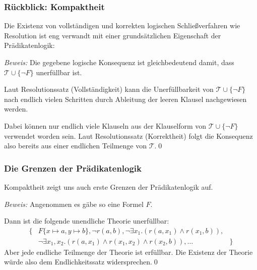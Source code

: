 \documentclass[aspectratio=1610,onlymath]{beamer}
\begin{document}
\maketitle

\begin{frame}\frametitle{Rückblick: Kompaktheit}

Die Existenz von vollständigen und korrekten logischen Schließverfahren wie Resolution
ist eng verwandt mit einer grundsätzlichen Eigenschaft der Prädikatenlogik:\bigskip

\pause

\small
\emph{Beweis:} Die gegebene logische Konsequenz ist gleichbedeutend damit, dass
$\mathcal{T}\cup\{\neg F\}$ unerfüllbar ist.\medskip

Laut Resolutionssatz (Vollständigkeit) kann die Unerfüllbarkeit von $\mathcal{T}\cup\{\neg F\}$ nach endlich vielen Schritten durch Ableitung der leeren Klausel nachgewiesen werden.\medskip

Dabei können nur endlich viele Klauseln aus der Klauselform von $\mathcal{T}\cup\{\neg F\}$ verwendet worden sein. Laut Resolutionssatz (Korrektheit) folgt die Konsequenz also bereits aus einer endlichen Teilmenge von $\mathcal{T}$.\qed

\end{frame}


\begin{frame}\frametitle{Die Grenzen der Prädikatenlogik}

Kompaktheit zeigt uns auch erste Grenzen der Prädikatenlogik auf.
\smallskip

\pause

\pause

\emph{Beweis:} Angenommen es gäbe so eine Formel $F$.\medskip

Dann ist die folgende unendliche Theorie unerfüllbar:
\[\begin{array}{rll}
\big\{ & F\{x\mapsto a,y\mapsto b\},\neg r(a,b), \neg \exists x_1.(r(a,x_1)\wedge r(x_1,b)),\\
& \neg\exists x_1,x_2.(r(a,x_1)\wedge
r(x_1,x_2)\wedge r(x_2,b)),\ldots & \big\}
\end{array}\]
Aber jede endliche Teilmenge der Theorie ist erfüllbar.
Die Existenz der Theorie würde also dem Endlichkeitssatz widersprechen.\qed

\end{frame}
\end{document}
